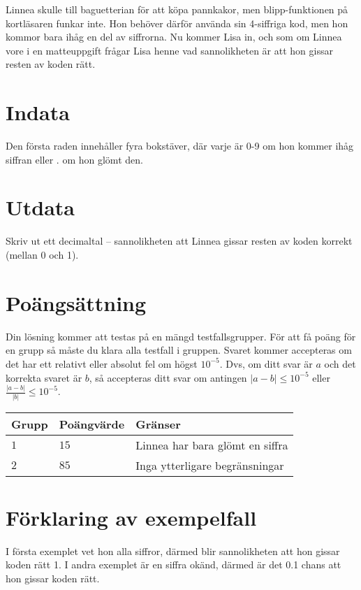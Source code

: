 Linnea skulle till baguetterian för att köpa pannkakor, men blipp-funktionen på kortläsaren funkar inte.
Hon behöver därför använda sin 4-siffriga kod, men hon kommor bara ihåg en del av siffrorna.
Nu kommer Lisa in, och som om Linnea vore i en matteuppgift frågar Lisa henne vad sannolikheten är att hon gissar resten av koden rätt.   


\section*{Indata}
Den första raden innehåller fyra bokstäver, där varje är 0-9 om hon kommer ihåg siffran eller . om hon glömt den.

\section*{Utdata}
Skriv ut ett decimaltal -- sannolikheten att Linnea gissar resten av koden korrekt (mellan 0 och 1).

\section*{Poängsättning}
Din lösning kommer att testas på en mängd testfallsgrupper.
För att få poäng för en grupp så måste du klara alla testfall i gruppen.
Svaret kommer accepteras om det har ett relativt eller absolut fel om högst $10^{-5}$.
Dvs, om ditt svar är $a$ och det korrekta svaret är $b$, så accepteras ditt svar om
antingen $|a-b| \le 10^{-5}$ eller $\frac{|a-b|}{|b|} \le 10^{-5}$.

\noindent
\begin{tabular}{| l | l | p{12cm} |}
  \hline
  Grupp & Poängvärde & Gränser \\ \hline
  $1$   & $15$       & Linnea har bara glömt en siffra \\ \hline
  $2$   & $85$       & Inga ytterligare begränsningar  \\ \hline
\end{tabular}

\section*{Förklaring av exempelfall}
I första exemplet vet hon alla siffror, därmed blir sannolikheten att hon gissar koden rätt 1.
I andra exemplet är en siffra okänd, därmed är det 0.1 chans att hon gissar koden rätt.